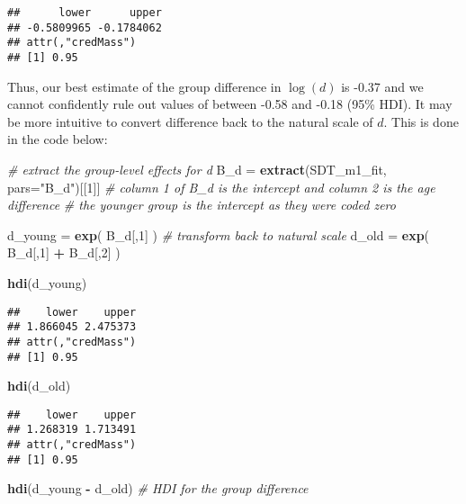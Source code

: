 \documentclass[
  english,
  ,man,floatsintext]{apa6}
\newenvironment{Shaded}{\begin{snugshade}}{\end{snugshade}}
\newcommand{\CommentTok}[1]{\textcolor[rgb]{0.56,0.35,0.01}{\textit{#1}}}
\newcommand{\DataTypeTok}[1]{\textcolor[rgb]{0.13,0.29,0.53}{#1}}
\newcommand{\DecValTok}[1]{\textcolor[rgb]{0.00,0.00,0.81}{#1}}
\newcommand{\KeywordTok}[1]{\textcolor[rgb]{0.13,0.29,0.53}{\textbf{#1}}}
\newcommand{\NormalTok}[1]{#1}
\newcommand{\OperatorTok}[1]{\textcolor[rgb]{0.81,0.36,0.00}{\textbf{#1}}}
\newcommand{\StringTok}[1]{\textcolor[rgb]{0.31,0.60,0.02}{#1}}
\begin{document}
\begin{verbatim}
##      lower      upper 
## -0.5809965 -0.1784062 
## attr(,"credMass")
## [1] 0.95
\end{verbatim}

Thus, our best estimate of the group difference in \(\log(d)\) is -0.37 and we cannot confidently rule out values of between -0.58 and -0.18 (95\% HDI). It may be more intuitive to convert difference back to the natural scale of \(d\). This is done in the code below:

\begin{Shaded}
\begin{Highlighting}[]
\CommentTok{# extract the group-level effects for d}
\NormalTok{B_d =}\StringTok{ }\KeywordTok{extract}\NormalTok{(SDT_m1_fit, }\DataTypeTok{pars=}\StringTok{"B_d"}\NormalTok{)[[}\DecValTok{1}\NormalTok{]]}
\CommentTok{# column 1 of B_d is the intercept and column 2 is the age difference}
\CommentTok{# the younger group is the intercept as they were coded zero}

\NormalTok{d_young =}\StringTok{ }\KeywordTok{exp}\NormalTok{( B_d[,}\DecValTok{1}\NormalTok{] ) }\CommentTok{# transform back to natural scale}
\NormalTok{d_old =}\StringTok{ }\KeywordTok{exp}\NormalTok{( B_d[,}\DecValTok{1}\NormalTok{] }\OperatorTok{+}\StringTok{ }\NormalTok{B_d[,}\DecValTok{2}\NormalTok{] )}

\KeywordTok{hdi}\NormalTok{(d_young)}
\end{Highlighting}
\end{Shaded}

\begin{verbatim}
##    lower    upper 
## 1.866045 2.475373 
## attr(,"credMass")
## [1] 0.95
\end{verbatim}

\begin{Shaded}
\begin{Highlighting}[]
\KeywordTok{hdi}\NormalTok{(d_old)}
\end{Highlighting}
\end{Shaded}

\begin{verbatim}
##    lower    upper 
## 1.268319 1.713491 
## attr(,"credMass")
## [1] 0.95
\end{verbatim}

\begin{Shaded}
\begin{Highlighting}[]
\KeywordTok{hdi}\NormalTok{(d_young }\OperatorTok{-}\StringTok{ }\NormalTok{d_old) }\CommentTok{# HDI for the group difference}
\end{Highlighting}
\end{Shaded}
\end{document}
